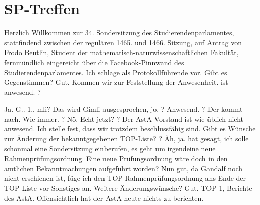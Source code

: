 
\newpage
\section{SP-Treffen}
\label{sec:sp-treffen}
    \charaktere{\Frodo, \Sum, \Gimli, \Legolars, \Elron, \Gandalf, \Galadriel}
    

\begin{verseplay}[10em]
\s{\Elron} Herzlich Willkommen zur 34. Sondersitzung des Studierendenparlamentes, stattfindend zwischen der regulären 1465. und 1466. Sitzung, auf Antrag von Frodo Beutlin, Student der mathematisch-naturwissenschaftlichen Fakultät, fernmündlich eingereicht über die Facebook-Pinnwand des Studierendenparlamentes. Ich schlage \Galadriel als Protokollführende vor. Gibt es Gegenstimmen?  Gut. Kommen wir zur Feststellung der Anwesenheit. \Galadriel ist anwesend. \Sum ?


\s{\Sum} Ja.
\s{\Elron} G.. 1.. mli?
\s{\Gimli} Das wird Gimli ausgesprochen, jo.
\s{\Elron} \Legolars ?
\s{\Legolars} Anwesend. 
\s{\Elron} \Gandalf ?
\s{\Frodo} Der kommt nach.
\s{\Elron} Wie immer. \Frodo ?
\s{\Frodo} Nö.
\s{\Elron} Echt jetzt? \Saruman ?  Der AstA-Vorstand ist wie üblich nicht anwesend. Ich stelle fest, dass wir trotzdem beschlussfähig sind. Gibt es Wünsche zur Änderung der bekanntgegebenen TOP-Liste?  \Frodo?
\s{\Frodo} Äh, ja. \Gandalf hat gesagt, ich solle schonmal eine Sondersitzung einberufen, es geht um irgendeine neue Rahmenprüfungsordnung.
\s{\Elron} Eine neue Prüfungsordnung wäre doch in den amtlichen Bekanntmachungen aufgeführt worden?
\s{\Elron} Nun gut, da Gandalf noch nicht erschienen ist, füge ich den TOP Rahmenprüfungsordnung ans Ende der TOP-Liste vor Sonstiges an. Weitere Änderungswünsche?  Gut. TOP 1, Berichte des AstA.  Offensichtlich hat der AstA heute nichts zu berichten.


\end{verseplay}
